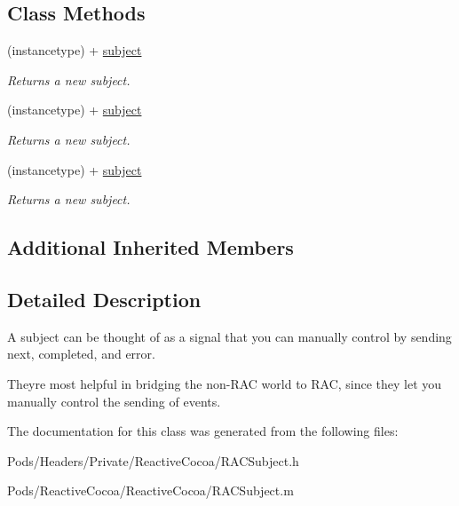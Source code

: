 \subsection*{Class Methods}
\begin{DoxyCompactItemize}
\item 
\mbox{\label{interface_r_a_c_subject_a80ceeef3605f5bf5c76c45ecb5532bf6}} 
(instancetype) + \mbox{\hyperlink{interface_r_a_c_subject_a80ceeef3605f5bf5c76c45ecb5532bf6}{subject}}
\begin{DoxyCompactList}\small\item\em Returns a new subject. \end{DoxyCompactList}\item 
\mbox{\label{interface_r_a_c_subject_a80ceeef3605f5bf5c76c45ecb5532bf6}} 
(instancetype) + \mbox{\hyperlink{interface_r_a_c_subject_a80ceeef3605f5bf5c76c45ecb5532bf6}{subject}}
\begin{DoxyCompactList}\small\item\em Returns a new subject. \end{DoxyCompactList}\item 
\mbox{\label{interface_r_a_c_subject_a80ceeef3605f5bf5c76c45ecb5532bf6}} 
(instancetype) + \mbox{\hyperlink{interface_r_a_c_subject_a80ceeef3605f5bf5c76c45ecb5532bf6}{subject}}
\begin{DoxyCompactList}\small\item\em Returns a new subject. \end{DoxyCompactList}\end{DoxyCompactItemize}
\subsection*{Additional Inherited Members}


\subsection{Detailed Description}
A subject can be thought of as a signal that you can manually control by sending next, completed, and error.

They\textquotesingle{}re most helpful in bridging the non-\/\+R\+AC world to R\+AC, since they let you manually control the sending of events. 

The documentation for this class was generated from the following files\+:\begin{DoxyCompactItemize}
\item 
Pods/\+Headers/\+Private/\+Reactive\+Cocoa/R\+A\+C\+Subject.\+h\item 
Pods/\+Reactive\+Cocoa/\+Reactive\+Cocoa/R\+A\+C\+Subject.\+m\end{DoxyCompactItemize}
